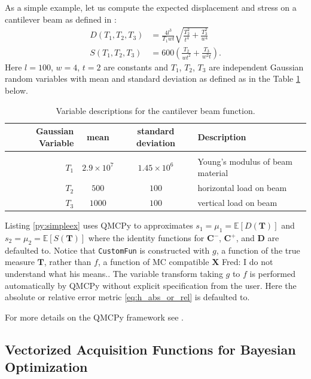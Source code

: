 \documentclass[graybox]{svmult}
\newcommand{\FJHComment}[1]{{\color{purple}Fred:  #1}}
\begin{document}
As a simple example, let us compute the expected displacement and stress on a cantilever beam as defined in \cite{ simulationlib_cantilever}: 
\begin{align*}
    D(T_1,T_2,T_3) &= \frac{4l^3}{T_1 w t} \sqrt{\frac{T_2^2}{t^4} + \frac{T_3^2}{w^4}} \\ 
    S(T_1,T_2,T_3) &= 600\left(\frac{T_2}{wt^2} + \frac{T_3}{w^2t}\right).
    \label{eq:cantilever_beam}
\end{align*}
Here $l=100$, $w=4$, $t=2$ are constants and $T_1$, $T_2$, $T_3$ are independent Gaussian random variables with mean and standard deviation as defined as in the Table \ref{tab:cantilever_beam} below.
\begin{table}[t]
    \centering
    \begin{tabular}{r c c l}
        Gaussian Variable & mean & standard deviation & Description \\ 
        \hline \\
        $T_1$ & $2.9 \times 10^7$ & $1.45 \times 10^6$ & Young's modulus of beam material \\
        $T_2$ & $500$ & $100$ & horizontal load on beam \\
        $T_3$ & $1000$ & $100$ & vertical load on beam
    \end{tabular}
    \caption{Variable descriptions for the cantilever beam function.}
    \label{tab:cantilever_beam}
\end{table}
Listing \ref{py:simpleex} uses QMCPy to approximates $s_1 = \mu_1 = \mathbb{E}[D(\boldsymbol{T})]$ and $s_2 = \mu_2 = \mathbb{E}[S(\boldsymbol{T})]$ where the identity functions for $\boldsymbol{C}^-$, $\boldsymbol{C}^+$, and $\boldsymbol{D}$ are defaulted to. Notice that \texttt{CustomFun} is constructed with $g$, a function of the true measure $\boldsymbol{T}$, rather than $f$, a function of MC compatible $\boldsymbol{X}$ \FJHComment{I do not understand what his means.}. The variable transform taking $g$ to $f$ is performed automatically by QMCPy without explicit specification from the user. Here the absolute or relative error metric \eqref{eq:h_abs_or_rel} is defaulted to.

For more details on the QMCPy framework see \cite{QMCSoftware}.

\subsection{Vectorized Acquisition Functions for Bayesian Optimization}
\end{document}
